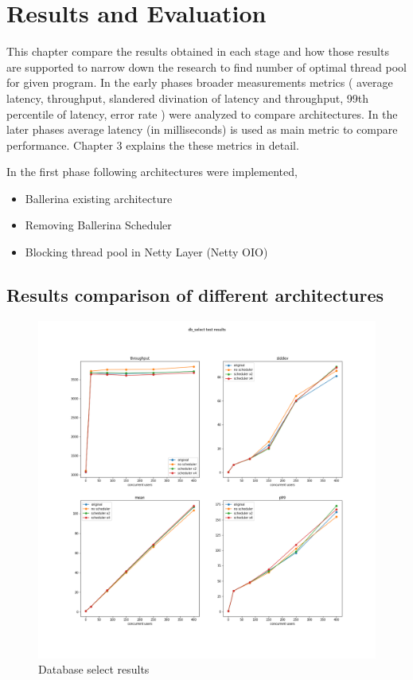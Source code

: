 \chapter{Results and Evaluation}

This chapter compare the results obtained in each stage and how those results are supported to narrow down the research to find number of optimal thread pool for given program. In the early phases broader measurements metrics ( average latency, throughput, slandered divination of latency and throughput, 99th percentile of latency, error rate ) were analyzed to compare  architectures. In the later phases average latency (in milliseconds) is used as main metric to compare performance. Chapter 3 explains the these metrics in detail.

In the first phase following architectures were implemented,

\begin{itemize}
	\item Ballerina existing architecture
	\item Removing Ballerina Scheduler
	\item Blocking thread pool in Netty Layer (Netty \acrshort{OIO}) 
\end{itemize}

\section{Results comparison of different architectures}

\begin{figure}[htbp]
	\begin{center}
		\includegraphics[scale=0.3]{figures/db_select test results.png}
	\end{center}
	\caption{Database select results}
	\label{db_select_results}
\end{figure}

